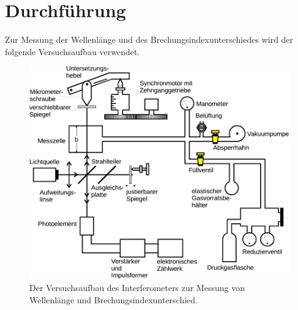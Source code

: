 \section{Durchführung}

    Zur Messung der Wellenlänge und des Brechungsindexunterschiedes wird der folgende Versuchsaufbau verwendet.

    \begin{figure}
        \centering
        \includegraphics[width=\textwidth]{content/img/Abb_7_edit.pdf}
        \caption{Der Versuchsaufbau des Interferometers zur Messung von Wellenlänge und Brechungsindexunterschied.}
    \end{figure}

